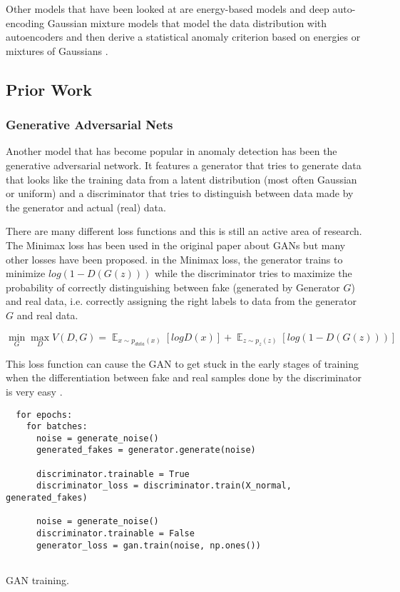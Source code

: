 \documentclass[]{article}
\DeclareMathOperator{\E}{\mathbb{E}}
\begin{document}
	 Other models that have been looked at are energy-based models and deep auto-encoding Gaussian mixture models that model the data distribution with autoencoders and then derive a statistical anomaly criterion based on energies or mixtures of Gaussians \cite{https://doi.org/10.48550/arxiv.1812.02288}. 
	
	 \subsection{Prior Work}
	 
	 \subsubsection{Generative Adversarial Nets}
	 Another model that has become popular in anomaly detection has been the generative adversarial network. It features a generator that tries to generate data that looks like the training data from a latent distribution (most often Gaussian or uniform) and a discriminator that tries to distinguish between data made by the generator and actual (real) data. 
	 
	 There are many different loss functions and this is still an active area of research. The Minimax loss has been used in the original paper about GANs but many other losses have been proposed. in the Minimax loss, the generator trains to minimize $log(1-D(G(z)))$ while the discriminator tries to maximize the probability of correctly distinguishing between fake (generated by Generator $G$) and real data, i.e. correctly assigning the right labels to data from the generator $G$ and real data. \cite{https://doi.org/10.48550/arxiv.1406.2661}
	 
	 \begin{equation}
	 	\min_G \max_D V(D, G) = \E_{x\sim p_{data}(x)}[logD(x)] + \E_{z\sim p_z (z)}[log(1 - D(G(z)))] 
	 \end{equation}
	 
	 This loss function can cause the GAN to get stuck in the early stages of training when the differentiation between fake and real samples done by the discriminator is very easy \cite{https://doi.org/10.48550/arxiv.1406.2661}.
	 
	 \begin{listing}
		\begin{verbatim}
  for epochs:
    for batches:
      noise = generate_noise()
      generated_fakes = generator.generate(noise)
      
      discriminator.trainable = True
      discriminator_loss = discriminator.train(X_normal, generated_fakes)
      
      noise = generate_noise()
      discriminator.trainable = False
      generator_loss = gan.train(noise, np.ones())
      
  	    \end{verbatim}
		\caption{GAN training.}
		\label{lst:gan}
	\end{listing}
	
\end{document}
